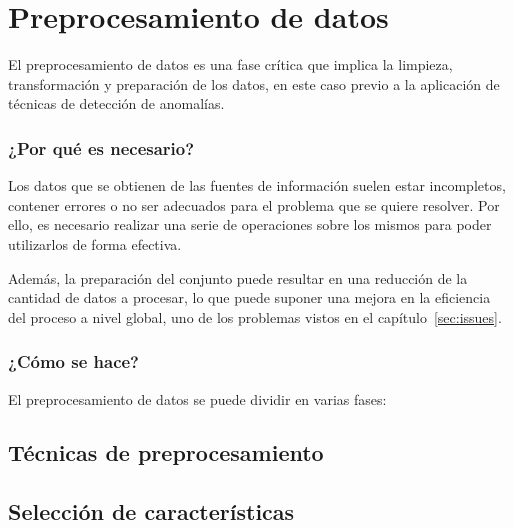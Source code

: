 \chapter{Preprocesamiento de datos}\label{chap:pre}
El preprocesamiento de datos es una fase crítica que implica la limpieza,
transformación y preparación de los datos, en este caso previo a la aplicación
de técnicas de detección de anomalías.

\nocite{herrera2004pre}

\subsection{¿Por qué es necesario?}
Los datos que se obtienen de las fuentes de información suelen estar incompletos,
contener errores o no ser adecuados para el problema que se quiere resolver.
Por ello, es necesario realizar una serie de operaciones sobre los mismos para
poder utilizarlos de forma efectiva.

Además, la preparación del conjunto puede resultar en una reducción de la cantidad
de datos a procesar, lo que puede suponer una mejora en la eficiencia del proceso
a nivel global, uno de los problemas vistos en el capítulo~\ref{sec:issues}.

\subsection{¿Cómo se hace?}
El preprocesamiento de datos se puede dividir en varias fases:
\section{Técnicas de preprocesamiento}

\section{Selección de características}
